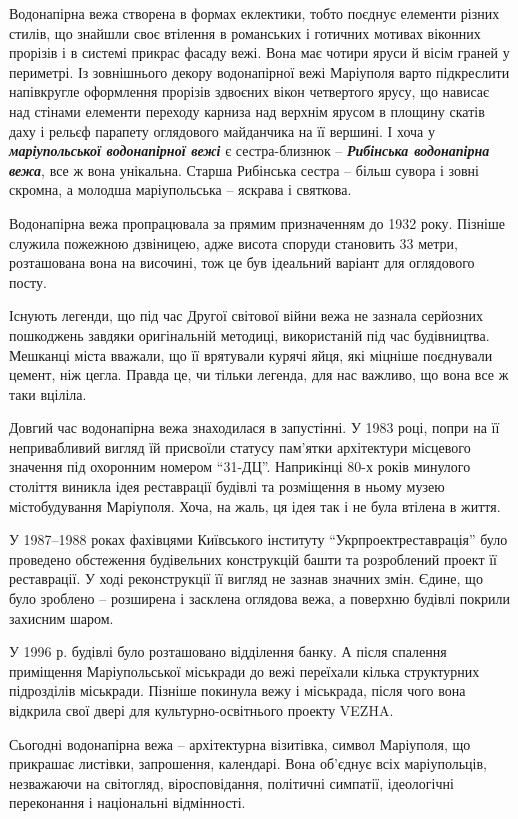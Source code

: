 Водонапірна вежа створена в формах еклектики, тобто поєднує елементи різних
стилів, що знайшли своє втілення в романських і готичних мотивах віконних
прорізів і в системі прикрас фасаду вежі. Вона має чотири яруси й вісім граней
у периметрі. Із зовнішнього декору водонапірної вежі Маріуполя варто
підкреслити напівкругле оформлення прорізів здвоєних вікон четвертого ярусу, що
нависає над стінами елементи переходу карниза над верхнім ярусом в площину
скатів даху і рельєф парапету оглядового майданчика на її вершині. І хоча у
\emph{\textbf{маріупольської водонапірної вежі}} є сестра-близнюк – \emph{\textbf{Рибінська водонапірна вежа}},
все ж вона унікальна. Старша Рибінська сестра – більш сувора і зовні скромна, а
молодша маріупольська – яскрава і святкова. 

Водонапірна вежа пропрацювала за прямим призначенням до 1932 року. Пізніше
служила пожежною дзвіницею, адже висота споруди становить 33 метри, розташована
вона на височині, тож це був ідеальний варіант для оглядового посту.

Існують легенди, що під час Другої світової війни вежа не зазнала серйозних
пошкоджень завдяки оригінальній методиці, використаній під час будівництва.
Мешканці міста вважали, що її врятували курячі яйця, які міцніше поєднували
цемент, ніж цегла. Правда це, чи тільки легенда, для нас важливо, що вона все ж
таки вціліла.


Довгий час водонапірна вежа знаходилася в запустінні. У 1983 році, попри на її
непривабливий вигляд їй присвоїли статусу пам'ятки архітектури місцевого
значення під охоронним номером \enquote{31-ДЦ}. Наприкінці 80-х років минулого століття
виникла ідея реставрації будівлі та розміщення в ньому музею містобудування
Маріуполя. Хоча, на жаль, ця ідея так і не була втілена в життя.

У 1987–1988 роках фахівцями Київського інституту \enquote{Укрпроектреставрація} було
проведено обстеження будівельних конструкцій башти та розроблений проект її
реставрації. У ході реконструкції її вигляд не зазнав значних змін. Єдине, що
було зроблено – розширена і засклена оглядова вежа, а поверхню будівлі покрили
захисним шаром.

У 1996 р. будівлі було розташовано відділення банку. А після спалення
приміщення Маріупольської міськради до вежі переїхали кілька структурних
підрозділів міськради. Пізніше покинула вежу і міськрада, після чого вона
відкрила свої двері для культурно-освітнього проекту VEZHA.


Сьогодні водонапірна вежа – архітектурна візитівка, символ Маріуполя, що
прикрашає листівки, запрошення, календарі. Вона об'єднує всіх маріупольців,
незважаючи на світогляд, віросповідання, політичні симпатії, ідеологічні
переконання і національні відмінності.

